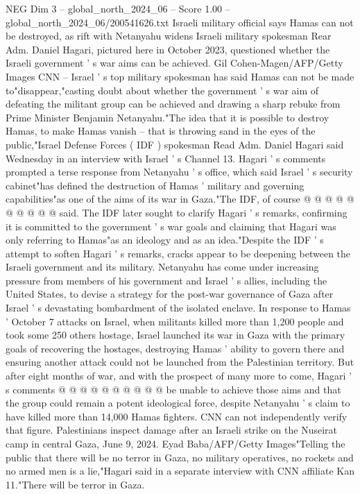 \begin{textsample}{NEG Dim 3 – global\_north\_2024\_06 – Score 1.00 – global\_north\_2024\_06/200541626.txt}  \label{ex:f3_neg_387}
Israeli military official says Hamas can not be destroyed, as rift with Netanyahu widens Israeli military spokesman Rear Adm.
Daniel Hagari, pictured here in October 2023, questioned whether the Israeli government ' s war aims can be achieved.
Gil Cohen-Magen/AFP/Getty Images CNN -- Israel ' s top military spokesman has said Hamas can not be made to"disappear,"casting doubt about whether the government ' s war aim of defeating the militant group can be achieved and drawing a sharp rebuke from Prime Minister Benjamin Netanyahu."The idea that it is possible to destroy Hamas, to make Hamas vanish -- that is throwing sand in the eyes of the public,"Israel Defense Forces ( IDF ) spokesman Read Adm.
Daniel Hagari said Wednesday in an interview with Israel ' s Channel 13.
Hagari ' s comments prompted a terse response from Netanyahu ' s office, which said Israel ' s security cabinet"has defined the destruction of Hamas ' military and governing capabilities"as one of the aims of its war in Gaza."The IDF, of course @ @ @ @ @ @ @ @ @ @ said.
The IDF later sought to clarify Hagari ' s remarks, confirming it is committed to the government ' s war goals and claiming that Hagari was only referring to Hamas"as an ideology and as an idea."Despite the IDF ' s attempt to soften Hagari ' s remarks, cracks appear to be deepening between the Israeli government and its military.
Netanyahu has come under increasing pressure from members of his government and Israel ' s allies, including the United States, to devise a strategy for the post-war governance of Gaza after Israel ' s devastating bombardment of the isolated enclave.
In response to Hamas ' October 7 attacks on Israel, when militants killed more than 1,200 people and took some 250 others hostage, Israel launched its war in Gaza with the primary goals of recovering the hostages, destroying Hamas ' ability to govern there and ensuring another attack could not be launched from the Palestinian territory.
But after eight months of war, and with the prospect of many more to come, Hagari ' s comments @ @ @ @ @ @ @ @ @ @ be unable to achieve those aims and that the group could remain a potent ideological force, despite Netanyahu ' s claim to have killed more than 14,000 Hamas fighters.
CNN can not independently verify that figure.
Palestinians inspect damage after an Israeli strike on the Nuseirat camp in central Gaza, June 9, 2024.
Eyad Baba/AFP/Getty Images"Telling the public that there will be no terror in Gaza, no military operatives, no rockets and no armed men is a lie,"Hagari said in a separate interview with CNN affiliate Kan 11."There will be terror in Gaza.

\end{textsample}
